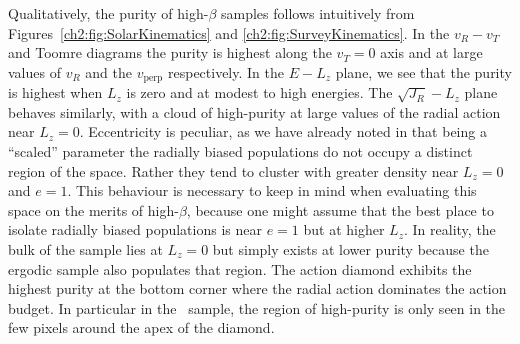 Qualitatively, the purity of high-$\beta$ samples follows intuitively from Figures~\ref{ch2:fig:SolarKinematics} and \ref{ch2:fig:SurveyKinematics}. In the $v_{R}-v_{T}$ and Toomre diagrams the purity is highest along the $v_{T}=0$ axis and at large values of $v_{R}$ and the $v_\mathrm{perp}$ respectively. In the $E-L_{z}$ plane, we see that the purity is highest when $L_{z}$ is zero and at modest to high energies. The $\sqrt{J_{R}}-L_{z}$ plane behaves similarly, with a cloud of high-purity at large values of the radial action near $L_{z}=0$. Eccentricity is peculiar, as we have already noted in that being a ``scaled'' parameter the radially biased populations do not occupy a distinct region of the space. Rather they tend to cluster with greater density near $L_{z}=0$ and $e=1$. This behaviour is necessary to keep in mind when evaluating this space on the merits of high-$\beta$, because one might assume that the best place to isolate radially biased populations is near $e=1$ but at higher $L_{z}$. In reality, the bulk of the sample lies at $L_{z}=0$ but simply exists at lower purity because the ergodic sample also populates that region. The action diamond exhibits the highest purity at the bottom corner where the radial action dominates the action budget. In particular in the \solar\ sample, the region of high-purity is only seen in the few pixels around the apex of the diamond.

